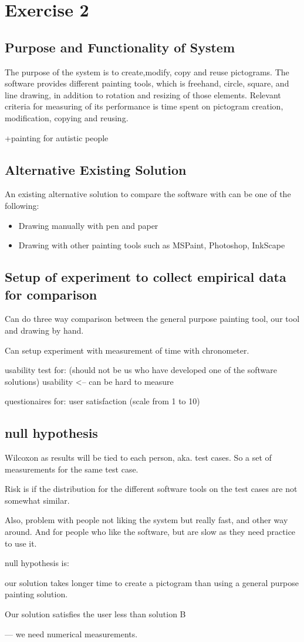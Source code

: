 \chapter*{Exercise 2}
\section*{Purpose and Functionality of System}
The purpose of the system is to create,modify, copy and reuse pictograms. The software provides different painting tools, which is freehand, circle, square, and line drawing, in addition to rotation and resizing of those elements. 
Relevant criteria for measuring of its performance is time spent on pictogram creation, modification, copying and reusing.

+painting for autistic people
\section*{Alternative Existing Solution}
An existing alternative solution to compare the software with can be one of the following:
\begin{itemize}
     \item Drawing manually with pen and paper
     \item Drawing with other painting tools such as MSPaint, Photoshop, InkScape
\end{itemize}

\section*{Setup of experiment to collect empirical data for comparison}
Can do three way comparison between the general purpose painting tool, our tool and drawing by hand.

Can setup experiment with measurement of
time with chronometer.

usability test for: (should not be us who have developed one of the software solutions)
usability <-- can be hard to measure

questionaires for:
user satisfaction (scale from 1 to 10)

\section*{null hypothesis}
Wilcoxon as results will be tied to each person, aka. test cases. So a set of measurements for the same test case.

Risk is if the distribution for the different software tools on the test cases are not somewhat similar.

Also, problem with people not liking the system but really fast, and other way around. 
And for people who like the software, but are slow as they need practice to use it.


null hypothesis is:

our solution takes longer time to create a pictogram than using a general purpose painting solution.

Our solution satisfies the user less than solution B


--- we need numerical measurements.

